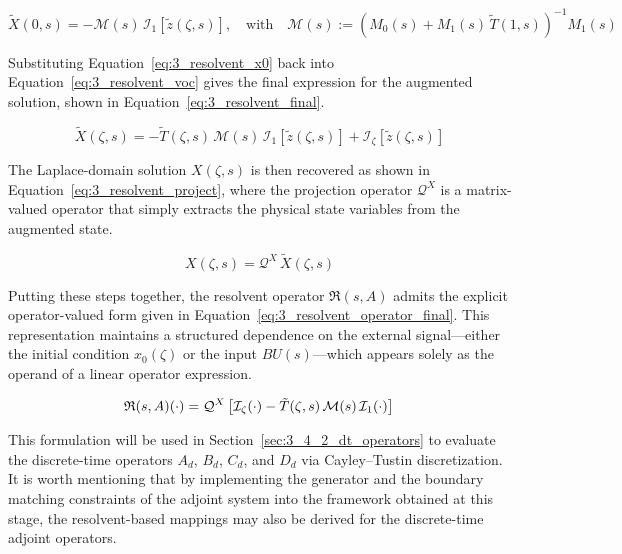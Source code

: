 \begin{equation} \label{eq:3_resolvent_x0}
    \tilde{X}(0, s) = -\mathcal{M}(s)\, \mathcal{I}_1[\tilde{z}(\zeta, s)], \quad \text{with} \quad \mathcal{M}(s) := \left( M_0(s) + M_1(s)\, \tilde{T}(1, s) \right)^{-1} M_1(s)
\end{equation}

Substituting Equation~\eqref{eq:3_resolvent_x0} back into Equation~\eqref{eq:3_resolvent_voc} gives the final expression for the augmented solution, shown in Equation~\eqref{eq:3_resolvent_final}. 

\begin{equation} \label{eq:3_resolvent_final}
\tilde{X}(\zeta, s) = -\tilde{T}(\zeta, s)\, \mathcal{M}(s)\, \mathcal{I}_1[\tilde{z}(\zeta, s)] + \mathcal{I}_\zeta[\tilde{z}(\zeta, s)]
\end{equation}

The Laplace-domain solution $X(\zeta, s)$ is then recovered as shown in Equation~\eqref{eq:3_resolvent_project}, where the projection operator $\mathcal{Q}^X$ is a matrix-valued operator that simply extracts the physical state variables from the augmented state.

\begin{equation} \label{eq:3_resolvent_project}
    X(\zeta, s) = \mathcal{Q}^X\, \tilde{X}(\zeta, s)
\end{equation}

Putting these steps together, the resolvent operator $\mathfrak{R}(s, A)$ admits the explicit operator-valued form given in Equation~\eqref{eq:3_resolvent_operator_final}. This representation maintains a structured dependence on the external signal—either the initial condition $x_0(\zeta)$ or the input $B U(s)$—which appears solely as the operand of a linear operator expression.

\begin{equation} \label{eq:3_resolvent_operator_final}
    \mathfrak{R}(s, A) (\cdot) = \mathcal{Q}^X \left[ \mathcal{I}_\zeta (\cdot) - \tilde{T}(\zeta, s)\, \mathcal{M}(s)\, \mathcal{I}_1 (\cdot)  \right] \\
\end{equation}

This formulation will be used in Section~\ref{sec:3_4_2_dt_operators} to evaluate the discrete-time operators $A_d$, $B_d$, $C_d$, and $D_d$ via Cayley--Tustin discretization. It is worth mentioning that by implementing the generator and the boundary matching constraints of the adjoint system into the framework obtained at this stage, the resolvent-based mappings may also be derived for the discrete-time adjoint operators.

